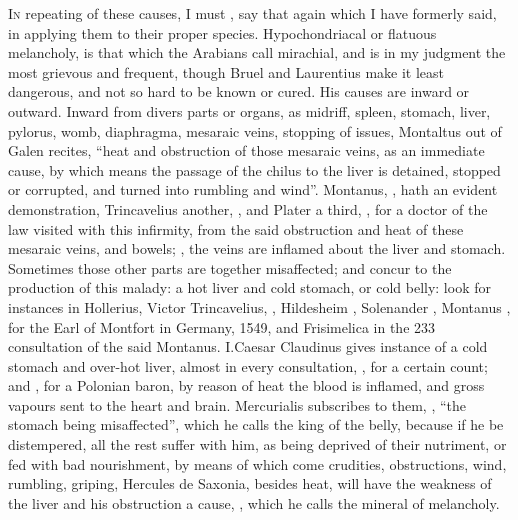 \lettrine{I}{n} repeating of these causes, I must , say that again which I have formerly said, in applying them to their
proper species. Hypochondriacal or flatuous melancholy, is that which the
Arabians call mirachial, and is in my judgment the most grievous and frequent,
though Bruel and Laurentius make it least dangerous, and not so hard to be
known or cured. His causes are inward or outward. Inward from divers parts or
organs, as midriff, spleen, stomach, liver, pylorus, womb, diaphragma, mesaraic
veins, stopping of issues, \etc{} Montaltus  out
of Galen recites, \enquote{heat and obstruction of those mesaraic
veins, as an immediate cause, by which means the passage of the chilus to the
liver is detained, stopped or corrupted, and turned into rumbling and wind}.
Montanus, , hath an evident demonstration,
Trincavelius another, , and Plater a
third, , for a doctor of the law visited
with this infirmity, from the said obstruction and heat of these mesaraic
veins, and bowels; ,
the veins are inflamed about the liver and stomach. Sometimes those other parts
are together misaffected; and concur to the production of this malady: a hot
liver and cold stomach, or cold belly: look for instances in Hollerius, Victor
Trincavelius, , Hildesheim
, Solenander
, Montanus
, for the Earl of Montfort in Germany, 1549,
and Frisimelica in the 233 consultation of the said Montanus. I.Caesar
Claudinus gives instance of a cold stomach and over-hot liver, almost in every
consultation, , for a certain count; and
, for a Polonian baron, by reason of heat the
blood is inflamed, and gross vapours sent to the heart and brain. Mercurialis
subscribes to them, , \enquote{the
stomach being misaffected}, which he calls the king of the belly, because if he
be distempered, all the rest suffer with him, as being deprived of their
nutriment, or fed with bad nourishment, by means of which come crudities,
obstructions, wind, rumbling, griping, \etc{} Hercules de Saxonia, besides
heat, will have the weakness of the liver and his obstruction a cause,
, which he calls the mineral of melancholy.
